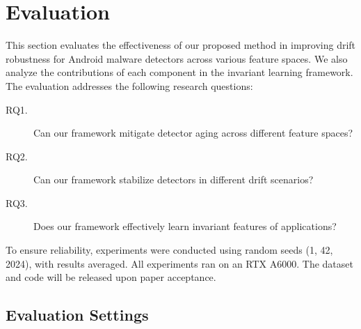 \section{Evaluation}
\label{evaluation}
This section evaluates the effectiveness of our proposed method in improving drift robustness for Android malware detectors across various feature spaces. We also analyze the contributions of each component in the invariant learning framework. The evaluation addresses the following research questions:
\begin{description}
    \item[RQ1.] Can our framework mitigate detector aging across different feature spaces?
    \item[RQ2.] Can our framework stabilize detectors in different drift scenarios?
    \item[RQ3.] Does our framework effectively learn invariant features of applications?
\end{description}
To ensure reliability, experiments were conducted using random seeds (1, 42, 2024), with results averaged. All experiments ran on an RTX A6000. The dataset and code will be released upon paper acceptance.




\subsection{Evaluation Settings}
